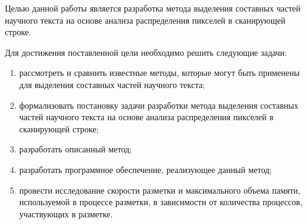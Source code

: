 Целью данной работы является разработка метода выделения составных частей научного текста на основе анализа распределения пикселей в сканирующей строке.

\newpage

Для достижения поставленной цели необходимо решить следующие задачи:
\begin{enumerate}
    \item рассмотреть и сравнить известные методы, которые могут быть применены для выделения составных частей научного текста;
    \item формализовать постановку задачи разработки метода выделения составных частей научного текста на основе анализа распределения пикселей в сканирующей строке;
    \item разработать описанный метод;
    \item разработать программное обеспечение, реализующее данный метод;
    \item провести исследование скорости разметки и максимального объема памяти, используемой в процессе разметки, в зависимости от количества процессов, участвующих в разметке.
\end{enumerate}

